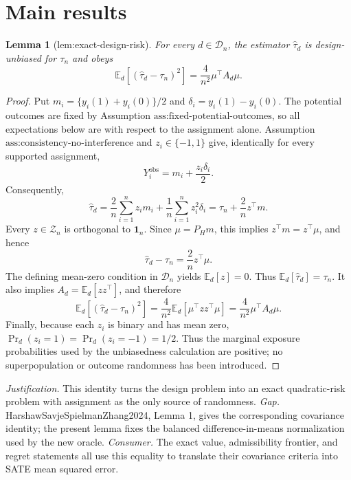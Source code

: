 \documentclass{article}
\newtheorem{lemma}{Lemma}
\begin{document}
\section{Main results}

\begin{lemma}[lem:exact-design-risk]\label{lem:exact-design-risk}
For every \(d\in\mathcal D_n\), the estimator \(\widehat\tau_d\) is design-unbiased for \(\tau_n\) and obeys \[\mathbb E_d[(\widehat\tau_d-\tau_n)^2]=\frac{4}{n^2}\mu^\top A_d\mu.\]
\end{lemma}
\begin{proof}
Put \(m_i=\{y_i(1)+y_i(0)\}/2\) and \(\delta_i=y_i(1)-y_i(0)\).  The potential outcomes are fixed by Assumption \(\text{ass:fixed-potential-outcomes}\), so all expectations below are with respect to the assignment alone.  Assumption \(\text{ass:consistency-no-interference}\) and \(z_i\in\{-1,1\}\) give, identically for every supported assignment,
\[
Y_i^{\mathrm{obs}}=m_i+\frac{z_i\delta_i}{2}.
\]
Consequently,
\[
\widehat\tau_d
=\frac{2}{n}\sum_{i=1}^n z_i m_i+\frac{1}{n}\sum_{i=1}^n z_i^2\delta_i
=\tau_n+\frac{2}{n}z^\top m.
\]
Every \(z\in\mathcal Z_n\) is orthogonal to \(\mathbf 1_n\).  Since \(\mu=P_Hm\), this implies \(z^\top m=z^\top\mu\), and hence
\[
\widehat\tau_d-\tau_n=\frac{2}{n}z^\top\mu.
\]
The defining mean-zero condition in \(\mathcal D_n\) yields \(\mathbb E_d[z]=0\).  Thus \(\mathbb E_d[\widehat\tau_d]=\tau_n\).  It also implies \(A_d=\mathbb E_d[zz^\top]\), and therefore
\[
\mathbb E_d[(\widehat\tau_d-\tau_n)^2]
=\frac{4}{n^2}\mathbb E_d[\mu^\top zz^\top\mu]
=\frac{4}{n^2}\mu^\top A_d\mu.
\]
Finally, because each \(z_i\) is binary and has mean zero, \(\Pr_d(z_i=1)=\Pr_d(z_i=-1)=1/2\).  Thus the marginal exposure probabilities used by the unbiasedness calculation are positive; no superpopulation or outcome randomness has been introduced.
\end{proof}
\par\smallskip\noindent \textit{Justification.} This identity turns the design problem into an exact quadratic-risk problem with assignment as the only source of randomness. \textit{Gap.} HarshawSavjeSpielmanZhang2024, Lemma 1, gives the corresponding covariance identity; the present lemma fixes the balanced difference-in-means normalization used by the new oracle. \textit{Consumer.} The exact value, admissibility frontier, and regret statements all use this equality to translate their covariance criteria into SATE mean squared error.
\end{document}
